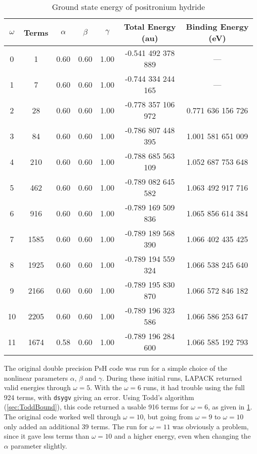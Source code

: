 \documentclass[Dissertation.tex]{subfiles}
\begin{document}
\setlength{\abovecaptionskip}{6pt}   %
\setlength{\belowcaptionskip}{6pt}   %
\begin{table}[H]
\centering
\begin{tabular}{c c c c c c c}
\toprule
$\omega$ & Terms & $\alpha$ & $\beta$ & $\gamma$ & Total Energy (au) & Binding Energy (eV) \\ [0.5ex]
\midrule
0 & 1 & 0.60 & 0.60 & 1.00 & -0.541 492 378 889 & --- \\
1 & 7 & 0.60 & 0.60 & 1.00 & -0.744 334 244 165 & --- \\
2 & 28 & 0.60 & 0.60 & 1.00 & -0.778 357 106 972 & 0.771 636 156 726 \\
3 & 84 & 0.60 & 0.60 & 1.00 & -0.786 807 448 395 & 1.001 581 651 009 \\
4 & 210 & 0.60 & 0.60 & 1.00 & -0.788 685 563 109 & 1.052 687 753 648 \\
5 & 462 & 0.60 & 0.60 & 1.00 & -0.789 082 645 582 & 1.063 492 917 716 \\
6 & 916 & 0.60 & 0.60 & 1.00 & -0.789 169 509 836 & 1.065 856 614 384 \\
7 & 1585 & 0.60 & 0.60 & 1.00 & -0.789 189 568 390 & 1.066 402 435 425 \\
8 & 1925 & 0.60 & 0.60 & 1.00 & -0.789 194 559 324 & 1.066 538 245 640 \\
9 & 2166 & 0.60 & 0.60 & 1.00 & -0.789 195 830 870 & 1.066 572 846 182 \\
10 & 2205 & 0.60 & 0.60 & 1.00 & -0.789 196 323 586 & 1.066 586 253 647 \\
11 & 1674 & 0.58 & 0.60 & 1.00 & -0.789 196 284 600 & 1.066 585 192 793 \\
\bottomrule
\end{tabular}
\caption{Ground state energy of positronium hydride} %
\label{tab:BoundEnergyOld}
\end{table}

The original double precision PsH code was run for a simple choice of the nonlinear parameters $\alpha$, $\beta$ and $\gamma$. During these initial runs, LAPACK returned valid energies through $\omega = 5$. With the $\omega = 6$ runs, it had trouble using the full 924 terms, with \texttt{dsygv} giving an error. Using Todd's algorithm (\cref{sec:ToddBound}), this code returned a usable 916 terms for $\omega = 6$, as given in \cref{tab:BoundEnergyOld}. The original code worked well through $\omega = 10$, but going from $\omega = 9$ to $\omega = 10$ only added an additional 39 terms. The run for $\omega = 11$ was obviously a problem, since it gave less terms than $\omega = 10$ and a higher energy, even when changing the $\alpha$ parameter slightly.
\end{document}
